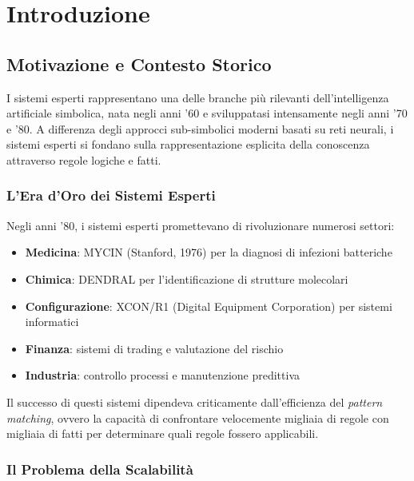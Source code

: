 
\chapter{Introduzione}
\label{cap:introduzione}

\section{Motivazione e Contesto Storico}

I sistemi esperti rappresentano una delle branche più rilevanti dell'intelligenza artificiale simbolica, nata negli anni '60 e sviluppatasi intensamente negli anni '70 e '80. A differenza degli approcci sub-simbolici moderni basati su reti neurali, i sistemi esperti si fondano sulla rappresentazione esplicita della conoscenza attraverso regole logiche e fatti.

\subsection{L'Era d'Oro dei Sistemi Esperti}

Negli anni '80, i sistemi esperti promettevano di rivoluzionare numerosi settori:

\begin{itemize}
\item \textbf{Medicina}: MYCIN (Stanford, 1976) per la diagnosi di infezioni batteriche
\item \textbf{Chimica}: DENDRAL per l'identificazione di strutture molecolari
\item \textbf{Configurazione}: XCON/R1 (Digital Equipment Corporation) per sistemi informatici
\item \textbf{Finanza}: sistemi di trading e valutazione del rischio
\item \textbf{Industria}: controllo processi e manutenzione predittiva
\end{itemize}

Il successo di questi sistemi dipendeva criticamente dall'efficienza del \textit{pattern matching}, ovvero la capacità di confrontare velocemente migliaia di regole con migliaia di fatti per determinare quali regole fossero applicabili.

\subsection{Il Problema della Scalabilità}


